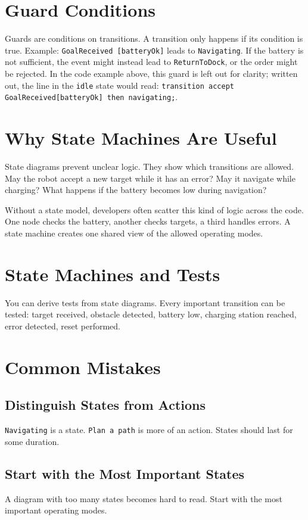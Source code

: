 \section{Guard Conditions}
Guards are conditions on transitions. A transition only happens if its condition is true. Example: \texttt{GoalReceived [batteryOk]} leads to \texttt{Navigating}. If the battery is not sufficient, the event might instead lead to \texttt{ReturnToDock}, or the order might be rejected. In the code example above, this guard is left out for clarity; written out, the line in the \texttt{idle} state would read: \texttt{transition accept GoalReceived[batteryOk] then navigating;}.

\section{Why State Machines Are Useful}
State diagrams prevent unclear logic. They show which transitions are allowed. May the robot accept a new target while it has an error? May it navigate while charging? What happens if the battery becomes low during navigation?

\begin{praxisbox}
Without a state model, developers often scatter this kind of logic across the code. One node checks the battery, another checks targets, a third handles errors. A state machine creates one shared view of the allowed operating modes.
\end{praxisbox}

\section{State Machines and Tests}
You can derive tests from state diagrams. Every important transition can be tested: target received, obstacle detected, battery low, charging station reached, error detected, reset performed.

\section{Common Mistakes}
\subsection{Distinguish States from Actions}
\texttt{Navigating} is a state. \texttt{Plan a path} is more of an action. States should last for some duration.

\subsection{Start with the Most Important States}
A diagram with too many states becomes hard to read. Start with the most important operating modes.

